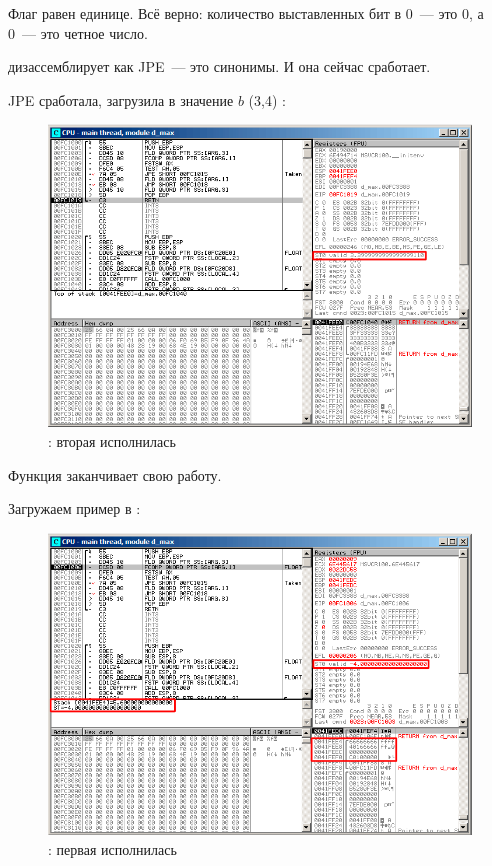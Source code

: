 Флаг  равен единице.
Всё верно: количество выставленных бит в 0~--- это 0, а 0~--- это четное число.

\olly дизассемблирует  как \ac{JPE}~--- это синонимы.
И она сейчас сработает.

\clearpage
\ac{JPE} сработала, \FLD загрузила в  значение $b$ (3,4)%
:

\begin{figure}[H]
\centering
\includegraphics[scale=\FigScale]{patterns/12_FPU/3_comparison/x86/MSVC/olly1_5.png}
\caption{\olly: вторая \FLD исполнилась}
\label{fig:FPU_comparison_case1_olly5}
\end{figure}

Функция заканчивает свою работу.

\clearpage
{}

Загружаем пример в \olly:

\begin{figure}[H]
\centering
\includegraphics[scale=\FigScale]{patterns/12_FPU/3_comparison/x86/MSVC/olly2_1.png}
\caption{\olly: первая \FLD исполнилась}
\label{fig:FPU_comparison_case2_olly1}
\end{figure}

